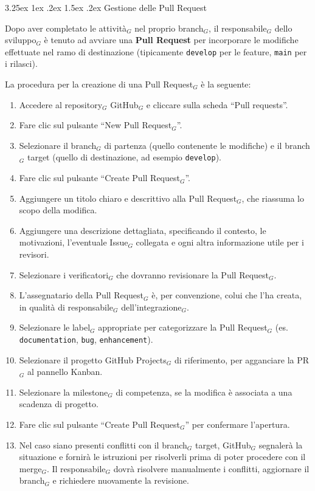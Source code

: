 \documentclass[a4paper, 10pt]{article}
\makeatletter
\renewcommand\paragraph{\@startsection{paragraph}{4}{\z@}%
  {3.25ex \@plus1ex \@minus .2ex}%
  {1.5ex \@plus .2ex}%
  {\normalfont\normalsize\bfseries}}
\makeatother
\begin{document}
\paragraph{Gestione delle Pull Request}

Dopo aver completato le attività$_G$ nel proprio branch$_G$, il responsabile$_G$ dello sviluppo$_G$ è tenuto ad avviare una \textbf{Pull Request} per incorporare le modifiche effettuate nel ramo di destinazione (tipicamente \texttt{develop} per le feature, \texttt{main} per i rilasci).

La procedura per la creazione di una Pull Request$_G$ è la seguente:
\begin{enumerate}
    \item Accedere al repository$_G$ GitHub$_G$ e cliccare sulla scheda ``Pull requests''.
    \item Fare clic sul pulsante ``New Pull Request$_G$''.
    \item Selezionare il branch$_G$ di partenza (quello contenente le modifiche) e il branch$_G$ target (quello di destinazione, ad esempio \texttt{develop}).
    \item Fare clic sul pulsante ``Create Pull Request$_G$''.
    \item Aggiungere un titolo chiaro e descrittivo alla Pull Request$_G$, che riassuma lo scopo della modifica.
    \item Aggiungere una descrizione dettagliata, specificando il contesto, le motivazioni, l'eventuale Issue$_G$ collegata e ogni altra informazione utile per i revisori.
    \item Selezionare i verificatori$_G$ che dovranno revisionare la Pull Request$_G$.
    \item L'assegnatario della Pull Request$_G$ è, per convenzione, colui che l'ha creata, in qualità di responsabile$_G$ dell'integrazione$_G$.
    \item Selezionare le label$_G$ appropriate per categorizzare la Pull Request$_G$ (es. \texttt{documentation}, \texttt{bug}, \texttt{enhancement}).
    \item Selezionare il progetto GitHub Projects$_G$ di riferimento, per agganciare la PR$_G$ al pannello Kanban.
    \item Selezionare la milestone$_G$ di competenza, se la modifica è associata a una scadenza di progetto.
    \item Fare clic sul pulsante ``Create Pull Request$_G$'' per confermare l'apertura.
    \item Nel caso siano presenti conflitti con il branch$_G$ target, GitHub$_G$ segnalerà la situazione e fornirà le istruzioni per risolverli prima di poter procedere con il merge$_G$. Il responsabile$_G$ dovrà risolvere manualmente i conflitti, aggiornare il branch$_G$ e richiedere nuovamente la revisione.
\end{enumerate}
\end{document}
